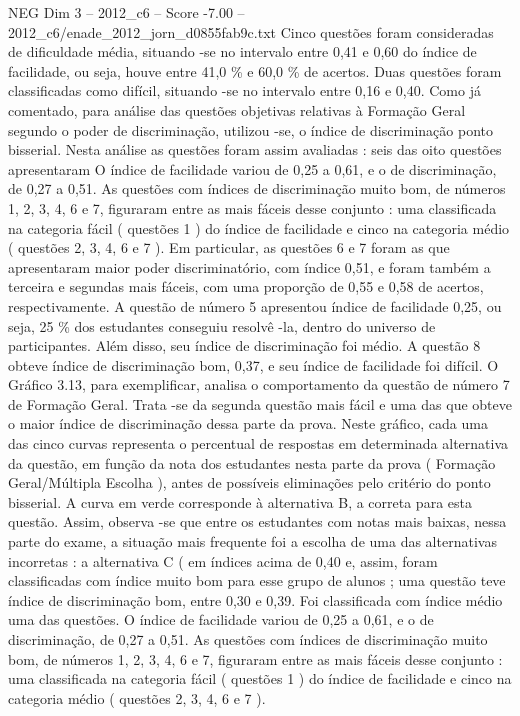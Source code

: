 \begin{textsample}{NEG Dim 3 – 2012\_c6 – Score -7.00 – 2012\_c6/enade\_2012\_jorn\_d0855fab9c.txt}
Cinco questões foram consideradas de dificuldade média, situando -se no intervalo entre 0,41 e 0,60 do índice de facilidade, ou seja, houve entre 41,0 \% e 60,0 \% de acertos.
Duas questões foram classificadas como difícil, situando -se no intervalo entre 0,16 e 0,40.
Como já comentado, para análise das questões objetivas relativas à Formação Geral segundo o poder de discriminação, utilizou -se, o índice de discriminação ponto bisserial.
Nesta análise as questões foram assim avaliadas : seis das oito questões apresentaram O índice de facilidade variou de 0,25 a 0,61, e o de discriminação, de 0,27 a 0,51.
As questões com índices de discriminação muito bom, de números 1, 2, 3, 4, 6 e 7, figuraram entre as mais fáceis desse conjunto : uma classificada na categoria fácil ( questões 1 ) do índice de facilidade e cinco na categoria médio ( questões 2, 3, 4, 6 e 7 ).
Em particular, as questões 6 e 7 foram as que apresentaram maior poder discriminatório, com índice 0,51, e foram também a terceira e segundas mais fáceis, com uma proporção de 0,55 e 0,58 de acertos, respectivamente.
A questão de número 5 apresentou índice de facilidade 0,25, ou seja, 25 \% dos estudantes conseguiu resolvê -la, dentro do universo de participantes.
Além disso, seu índice de discriminação foi médio.
A questão 8 obteve índice de discriminação bom, 0,37, e seu índice de facilidade foi difícil.
O Gráfico 3.13, para exemplificar, analisa o comportamento da questão de número 7 de Formação Geral.
Trata -se da segunda questão mais fácil e uma das que obteve o maior índice de discriminação dessa parte da prova.
Neste gráfico, cada uma das cinco curvas representa o percentual de respostas em determinada alternativa da questão, em função da nota dos estudantes nesta parte da prova ( Formação Geral/Múltipla Escolha ), antes de possíveis eliminações pelo critério do ponto bisserial.
A curva em verde corresponde à alternativa B, a correta para esta questão.
Assim, observa -se que entre os estudantes com notas mais baixas, nessa parte do exame, a situação mais frequente foi a escolha de uma das alternativas incorretas : a alternativa C ( em índices acima de 0,40 e, assim, foram classificadas com índice muito bom para esse grupo de alunos ; uma questão teve índice de discriminação bom, entre 0,30 e 0,39.
Foi classificada com índice médio uma das questões.
O índice de facilidade variou de 0,25 a 0,61, e o de discriminação, de 0,27 a 0,51.
As questões com índices de discriminação muito bom, de números 1, 2, 3, 4, 6 e 7, figuraram entre as mais fáceis desse conjunto : uma classificada na categoria fácil ( questões 1 ) do índice de facilidade e cinco na categoria médio ( questões 2, 3, 4, 6 e 7 ).

\end{textsample}
